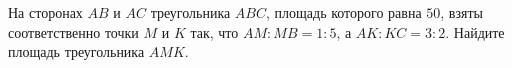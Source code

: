 \begin{ex}
	\begin{condition}
		На сторонах \( AB  \) и \( AC  \) треугольника \( ABC \), площадь которого равна \( 50 \), взяты соответственно точки \( M  \) и \( K  \) так, что \( AM : MB = 1 : 5 \), а \( AK : KC = 3 : 2 \). Найдите площадь треугольника \( AMK \).
	\end{condition}
\end{ex}